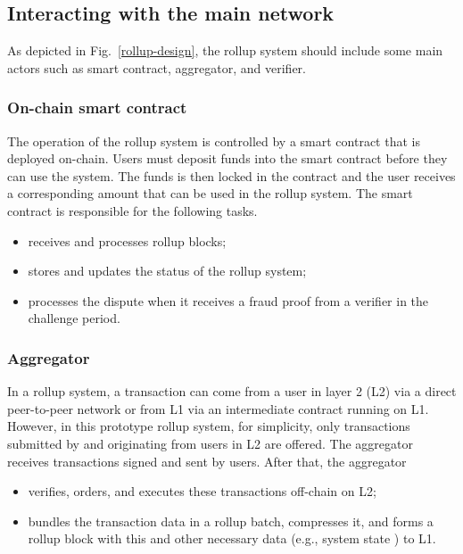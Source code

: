 \documentclass{article}
\begin{document}
\subsection{Interacting with the main network}
As depicted in Fig.~\ref{rollup-design}, the rollup system should include some main actors such as smart contract, aggregator, and verifier.

\subsubsection{On-chain smart contract}
The operation of the rollup system is controlled by a smart contract that is deployed on-chain. Users must deposit funds into the smart contract before they can use the system. The funds is then locked in the contract and the user receives a corresponding amount that can be used in the rollup system. The smart contract is responsible  for the following tasks.
\begin{itemize} 
\item receives and processes rollup blocks; 
\item stores and updates the status of the rollup system;  
\item processes the dispute when it receives a fraud proof from a verifier in the challenge period.
\end{itemize}

\subsubsection{Aggregator}
In a rollup system, a transaction can come from a user in layer 2 (L2) via a direct peer-to-peer network or from L1 via an intermediate contract running on L1. However, in this prototype rollup system, for simplicity, only transactions submitted by and originating from users in L2 are offered. The aggregator receives transactions signed and sent by users. After that, the aggregator
\begin{itemize} 
\item verifies, orders, and executes these transactions off-chain on L2; 
\item bundles the transaction data in a rollup batch, compresses it, and forms a rollup block with this and other necessary data (e.g., system state ) to L1. 
\end{itemize}
\end{document}
